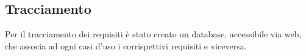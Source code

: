 \subsection{Tracciamento}

Per il tracciamento dei requisiti è stato creato un database, accessibile via web, che associa ad ogni casi d'uso i corrispettivi requisiti e viceversa.